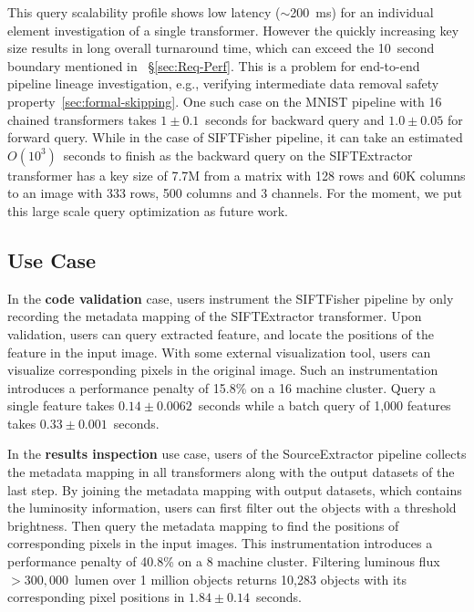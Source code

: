 \documentclass{sig-alternate}
\begin{document}
This query scalability profile shows low latency ($\sim$200~ms) for an individual element investigation of a single transformer. 
However the quickly increasing key size results in long overall turnaround time, which can exceed the 10~second boundary mentioned in ~\S\ref{sec:Req-Perf}. 
This is a problem for end-to-end pipeline lineage investigation, e.g., verifying intermediate data removal safety property~\ref{sec:formal-skipping}.
One such case on the MNIST pipeline with 16 chained transformers takes $1\pm0.1$~seconds for backward query and $1.0\pm 0.05$ for forward query.
While in the case of SIFTFisher pipeline,  it can take an estimated $O(10^3)$~seconds to finish as the backward query on the SIFTExtractor
transformer has a key size of 7.7M from a matrix with 128 rows and 60K columns to an image with 333 rows, 500 columns and 3 channels. 
For the moment, we put this large scale query optimization as future work.

\subsection{Use Case}
In the {\bf code validation} case, users instrument the SIFTFisher pipeline by only recording the metadata mapping of the SIFTExtractor transformer.
Upon validation, users can query extracted feature, and locate the positions of the feature in the input image. With some external visualization tool,
users can visualize corresponding pixels in the original image. Such an instrumentation introduces a performance penalty of 15.8\% on a 16 machine 
cluster.
Query a single feature takes $0.14\pm0.0062$~seconds while a batch query of 1,000 features takes $0.33\pm0.001$~seconds.

In the {\bf results inspection} use case, users of the SourceExtractor pipeline collects the metadata mapping in all transformers along with the output 
datasets of the last step. By joining the metadata mapping with output datasets, which contains the luminosity information, users can first filter out the
objects with a threshold brightness. Then query the metadata mapping to find the positions of corresponding pixels in the input images.
This instrumentation introduces a performance penalty of 40.8\% on a 8 machine cluster. 
Filtering luminous flux $>300,000$~lumen over 1 million objects returns 10,283 objects
with its corresponding pixel positions in $1.84\pm0.14$~seconds.
\end{document}
